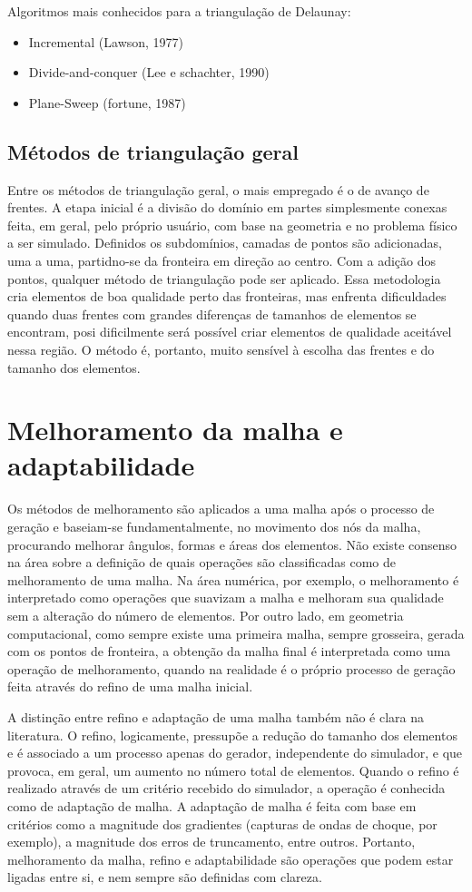 Algoritmos mais conhecidos para a triangulação de Delaunay:
\begin{itemize}
    \item Incremental (Lawson, 1977)
    \item Divide-and-conquer (Lee e schachter, 1990)
    \item Plane-Sweep (fortune, 1987)
\end{itemize}

\subsection{Métodos de triangulação geral}

Entre os métodos de triangulação geral, o mais empregado é o de avanço de frentes. A etapa inicial é a divisão do domínio em partes simplesmente conexas feita, em geral, pelo próprio usuário, com base na geometria e no problema físico a ser simulado. Definidos os subdomínios, camadas de pontos são adicionadas, uma a uma, partidno-se da fronteira em direção ao centro. Com a adição dos pontos, qualquer método de triangulação pode ser aplicado. Essa metodologia cria elementos de boa qualidade perto das fronteiras, mas enfrenta dificuldades quando duas frentes com grandes diferenças de tamanhos de elementos se encontram, posi dificilmente será possível criar elementos de qualidade aceitável nessa região. O método é, portanto, muito sensível à escolha das frentes e do tamanho dos elementos.

\section{Melhoramento da malha e adaptabilidade}
Os métodos de melhoramento são aplicados a uma malha após o processo de geração e baseiam-se fundamentalmente, no movimento dos nós da malha, procurando melhorar ângulos, formas e áreas dos elementos. Não existe consenso na área sobre a definição de quais operações são classificadas como de melhoramento de uma malha. Na área numérica, por exemplo, o melhoramento é interpretado como operações que suavizam a malha e melhoram sua qualidade sem a alteração do número de elementos. Por outro lado, em geometria computacional, como sempre existe uma primeira malha, sempre grosseira, gerada com os pontos de fronteira, a obtenção da malha final é interpretada como uma operação de melhoramento, quando na realidade é o próprio processo de geração feita através do refino de uma malha inicial.

A distinção entre refino e adaptação de uma malha também não é clara na literatura. O refino, logicamente, pressupõe a redução do tamanho dos elementos e é associado a um processo apenas do gerador, independente do simulador, e que provoca, em geral, um aumento no número total de elementos.
Quando o refino é realizado através de um critério recebido do simulador, a operação é conhecida como de adaptação de malha. A adaptação de malha é feita com base em critérios como a magnitude dos gradientes (capturas de ondas de choque, por exemplo), a magnitude dos erros de truncamento, entre outros. Portanto, melhoramento da malha, refino e adaptabilidade são operações que podem estar ligadas entre si, e nem sempre são definidas com clareza.

